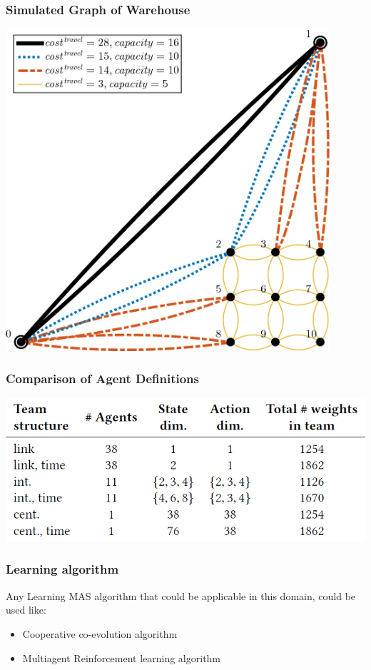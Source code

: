 \documentclass{beamer}
\begin{document}
	\begin{frame}
	\frametitle{Simulated Graph of Warehouse}
	\begin{center}
    \includegraphics[height=0.9\textheight,width=0.9\textwidth]{exp.png}
	\end{center}
	\end{frame}
	
	\begin{frame}
	\frametitle{Comparison of Agent Definitions}
	\begin{center}
    \includegraphics[width=1\textwidth]{comp.png}
	\end{center}
	\end{frame}
	
	\begin{frame}
			\frametitle{Learning algorithm}
			Any Learning MAS algorithm that could be applicable in this
			domain, could be used like:
			\begin{itemize}
				\item{Cooperative co-evolution algorithm}
				\item{Multiagent Reinforcement learning algorithm}
			\end{itemize}
	\end{frame}
\end{document}
